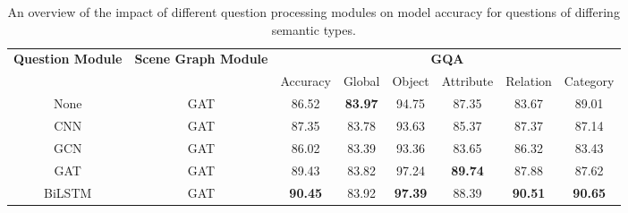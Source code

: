 \begin{table}[htbp]
\centering
\begin{footnotesize}
\begin{tabular}{cc|c|ccccc}
\toprule
\multirow{3}{0.1\textwidth}{\textbf{Question Module}} & \multirow{3}{0.1\textwidth}{\textbf{Scene Graph Module}} & \multicolumn{6}{c}{\multirow{2}{*}{\textbf{GQA}}}                                                   \\
                                          &                                              & \multicolumn{6}{c}{}                                                                                \\ \cmidrule(l){3-8} 
                                          &                                              & Accuracy       & Global         & Object         & Attribute      & Relation       & Category       \\ \midrule
None                                      & GAT                                          & 86.52          & \textbf{83.97}          & 94.75          & 87.35          & 83.67          & 89.01          \\
CNN                                       & GAT                                          & 87.35          & 83.78          & 93.63          & 85.37          & 87.37          & 87.14          \\
GCN                                       & GAT                                          & 86.02          & 83.39          & 93.36          & 83.65          & 86.32          & 83.43          \\
GAT                                       & GAT                                          & 89.43          & 83.82          & 97.24          & \textbf{89.74} & 87.88          & 87.62          \\
\midrule
BiLSTM                                    & GAT                                          & \textbf{90.45} & 83.92          & \textbf{97.39} & 88.39          & \textbf{90.51} & \textbf{90.65} \\ \bottomrule
\end{tabular}
\end{footnotesize}
\caption[Question processing module ablation performance for questions of differing semantic types.]{An overview of the impact of different question processing modules on model accuracy for questions of differing semantic types.}
\label{table:question_ablation_semantic}
\end{table}

